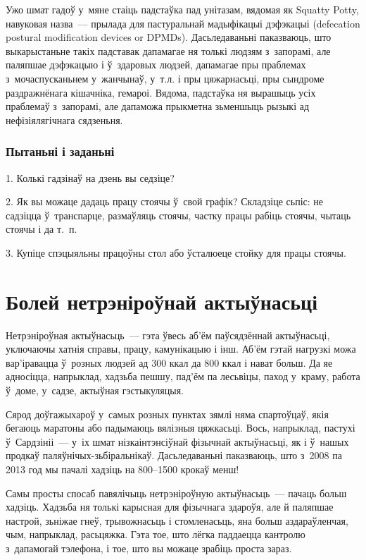 Ужо шмат гадоў у~мяне стаіць падстаўка пад унітазам, вядомая як Squatty Potty, навуковая назва~--- прылада для пастуральнай мадыфікацыі дэфэкацыі (defecation postural modification devices or DPMDs). Дасьледаваньні паказваюць, што выкарыстаньне такіх падставак дапамагае ня толькі людзям з~запорамі, але паляпшае дэфэкацыю і ў~здаровых людзей, дапамагае пры праблемах з~мочаспусканьнем у~жанчынаў, у~т.л. і пры цяжарнасьці, пры сындроме раздражнёнага кішачніка, гемароі. Вядома, падстаўка ня вырашыць усіх праблемаў з~запорамі, але дапаможа прыкметна зьменшыць рызыкі ад нефізіялягічнага сядзеньня.

\subsubsection{Пытаньні і заданьні}

1. Колькі гадзінаў на дзень вы седзіце?

2. Як вы можаце дадаць працу стоячы ў~свой графік? Складзіце сьпіс: не садзіцца ў~транспарце, размаўляць стоячы, частку працы рабіць стоячы, чытаць стоячы і да т.~п.

3. Купіце спэцыяльны працоўны стол або ўсталюеце стойку для працы стоячы.


\section{Болей нетрэніроўнай актыўнасьці}

Нетрэніроўная актыўнасьць~--- гэта ўвесь аб'ём паўсядзённай актыўнасьці, уключаючы хатнія справы, працу, камунікацыю і інш. Аб'ём гэтай нагрузкі можа вар'іравацца ў~розных людзей ад 300 ккал да 800 ккал і нават больш. Да яе адносіцца, напрыклад, хадзьба пешшу, пад'ём па лесьвіцы, паход у~краму, работа ў~доме, у~садзе, актыўная гэстыкуляцыя.

Сярод доўгажыхароў у~самых розных пунктах зямлі няма спартоўцаў, якія бегаюць маратоны або падымаюць вялізныя цяжкасьці. Вось, напрыклад, пастухі ў~Сардзініі~--- у~іх шмат нізкаінтэнсіўнай фізычнай актыўнасьці, як і ў~нашых продкаў паляўнічых-зьбіральнікаў. Дасьледаваньні паказваюць, што з~2008 па 2013 год мы пачалі хадзіць на 800--1500 крокаў менш!

Самы просты спосаб павялічыць нетрэніроўную актыўнасьць~--- пачаць больш хадзіць. Хадзьба ня толькі карысная для фізычнага здароўя, але й паляпшае настрой, зьніжае гнеў, трывожнасьць і стомленасьць, яна больш аздараўленчая, чым, напрыклад, расьцяжка. Гэта тое, што лёгка паддаецца кантролю з~дапамогай тэлефона, і тое, што вы можаце зрабіць проста зараз.

